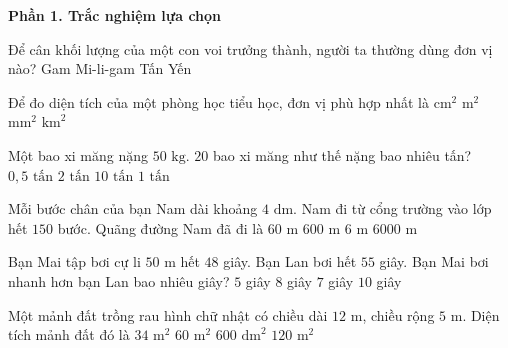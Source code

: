 \textbf{Phần 1. Trắc nghiệm lựa chọn}

\begin{ex} %
Để cân khối lượng của một con voi trưởng thành, người ta thường dùng đơn vị nào?
\choice
{Gam}
{Mi-li-gam}
{\True Tấn}
{Yến}
\end{ex}

\begin{ex} %
Để đo diện tích của một phòng học tiểu học, đơn vị phù hợp nhất là
\choice
{$\text{cm}^2$}
{\True $\text{m}^2$}
{$\text{mm}^2$}
{$\text{km}^2$}
\end{ex}

\begin{ex} %
Một bao xi măng nặng $50\text{ kg}$. $20$ bao xi măng như thế nặng bao nhiêu tấn?
\choice
{$0{,}5\text{ tấn}$}
{$2\text{ tấn}$}
{$10\text{ tấn}$}
{\True $1\text{ tấn}$}
\end{ex}

\begin{ex} %
Mỗi bước chân của bạn Nam dài khoảng $4\text{ dm}$. Nam đi từ cổng trường vào lớp hết $150$ bước. Quãng đường Nam đã đi là
\choice
{\True $60\text{ m}$}
{$600\text{ m}$}
{$6\text{ m}$}
{$6000\text{ m}$}
\end{ex}

\begin{ex} %
Bạn Mai tập bơi cự li $50\text{ m}$ hết $48$ giây. Bạn Lan bơi hết $55$ giây. Bạn Mai bơi nhanh hơn bạn Lan bao nhiêu giây?
\choice
{$5$ giây}
{$8$ giây}
{\True $7$ giây}
{$10$ giây}
\end{ex}

\begin{ex} %
Một mảnh đất trồng rau hình chữ nhật có chiều dài $12\text{ m}$, chiều rộng $5\text{ m}$. Diện tích mảnh đất đó là
\choice
{$34\text{ m}^2$}
{\True $60\text{ m}^2$}
{$600\text{ dm}^2$}
{$120\text{ m}^2$}
\end{ex}

